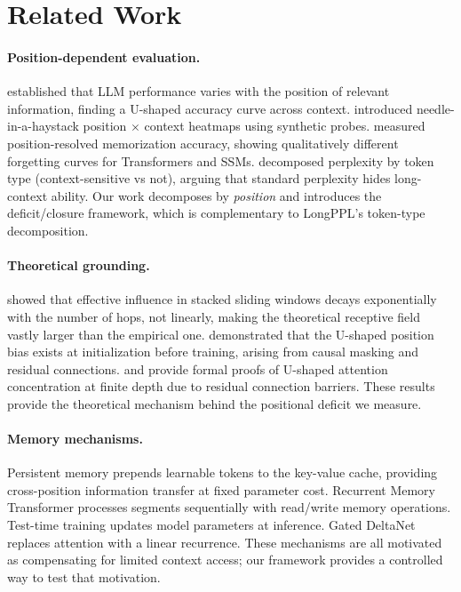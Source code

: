\documentclass[11pt]{article}
\begin{document}
\section{Related Work}
\label{sec:related}

\paragraph{Position-dependent evaluation.}
\citet{liu2023lost} established that LLM performance varies with the
position of relevant information, finding a U-shaped accuracy curve
across context. \citet{kamradt2024niah} introduced needle-in-a-haystack
position $\times$ context heatmaps using synthetic probes.
\citet{liu2024forgetting} measured position-resolved memorization
accuracy, showing qualitatively different forgetting curves for
Transformers and SSMs. \citet{fang2025longppl} decomposed perplexity by
token type (context-sensitive vs not), arguing that standard perplexity
hides long-context ability. Our work decomposes by \emph{position} and
introduces the deficit/closure framework, which is complementary to
LongPPL's token-type decomposition.

\paragraph{Theoretical grounding.}
\citet{xiao2025sliding} showed that effective influence in stacked
sliding windows decays exponentially with the number of hops, not
linearly, making the theoretical receptive field vastly larger than the
empirical one. \citet{chowdhury2026lost} demonstrated that the U-shaped
position bias exists at initialization before training, arising from
causal masking and residual connections. \citet{wu2025position} and
\citet{herasimchyk2026residual} provide formal proofs of U-shaped
attention concentration at finite depth due to residual connection
barriers. These results provide the theoretical mechanism behind the
positional deficit we measure.

\paragraph{Memory mechanisms.}
Persistent memory \citep{sukhbaatar2019persistent} prepends learnable
tokens to the key-value cache, providing cross-position information
transfer at fixed parameter cost. Recurrent Memory Transformer
\citep{bulatov2022rmt} processes segments sequentially with read/write
memory operations. Test-time training \citep{sun2024ttt} updates model
parameters at inference. Gated DeltaNet \citep{yang2025gated} replaces
attention with a linear recurrence. These mechanisms are all motivated
as compensating for limited context access; our framework provides a
controlled way to test that motivation.
\end{document}
